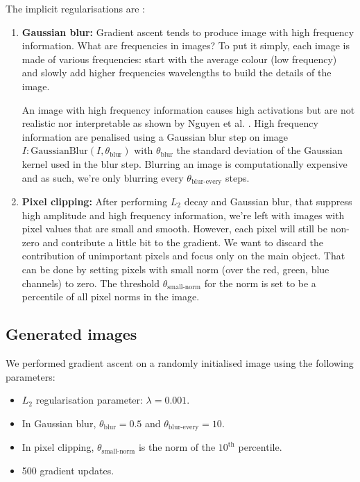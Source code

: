The implicit regularisations are \cite{class-vis2}:
\begin{enumerate}
    \item \textbf{Gaussian blur:} Gradient ascent tends to produce image with high frequency information. What are frequencies in images? To put it simply, each image 
    is made of various frequencies: start with the average colour (low frequency) and slowly add higher frequencies wavelengths to build the details of the image.
    
    An image with high frequency information causes high activations but are not realistic nor interpretable as shown by Nguyen et al. \cite{nguyen}. High frequency 
    information are penalised using a Gaussian blur step on image $I: \text{GaussianBlur}(I, \theta_{\text{blur}})$ with $\theta_{\text{blur}}$ the standard deviation of the 
    Gaussian kernel used in the blur step. Blurring an image is computationally expensive and as such, we're only blurring every $\theta_{\text{blur-every}}$ steps.
    \item \textbf{Pixel clipping:} After performing $L_2$ decay and Gaussian blur, that suppress high amplitude and high frequency information, we're left with images 
    with pixel values that are small and smooth. However, each pixel will still be non-zero and contribute a little bit to the gradient. We want to discard the contribution of 
    unimportant pixels and focus only on the main object. That can be done by setting pixels with small norm (over the red, green, blue channels) to zero. The threshold  
    $\theta_{\text{small-norm}}$ for the norm is set to be a percentile of all pixel norms in the image.
\end{enumerate}

\subsection{Generated images}

We performed gradient ascent on a randomly initialised image using the following parameters:
\begin{itemize}
    \item $L_2$ regularisation parameter: $\lambda = 0.001$.
    \item In Gaussian blur, $\theta_{\text{blur}} = 0.5$ and $\theta_{\text{blur-every}} = 10$.
    \item In pixel clipping, $\theta_{\text{small-norm}}$ is the norm of the $10^{\text{th}}$ percentile.
    \item 500 gradient updates.
\end{itemize}

